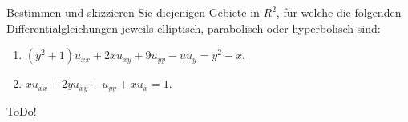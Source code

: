 
\begin{exercise}

Bestimmen und skizzieren Sie diejenigen Gebiete in $R^2$, fur welche die folgenden Differentialgleichungen jeweils elliptisch, parabolisch oder hyperbolisch sind:

\begin{enumerate}[label = (\roman*)]
    \item $(y^2 + 1) u_{xx} + 2 x u_{xy} + 9 u_{yy} - u u_y = y^2 - x$,
    \item $x u_{xx} + 2 y u_{xy} + u_{yy} + x u_x = 1$.
\end{enumerate}

\end{exercise}


\begin{solution}

ToDo!

\end{solution}

